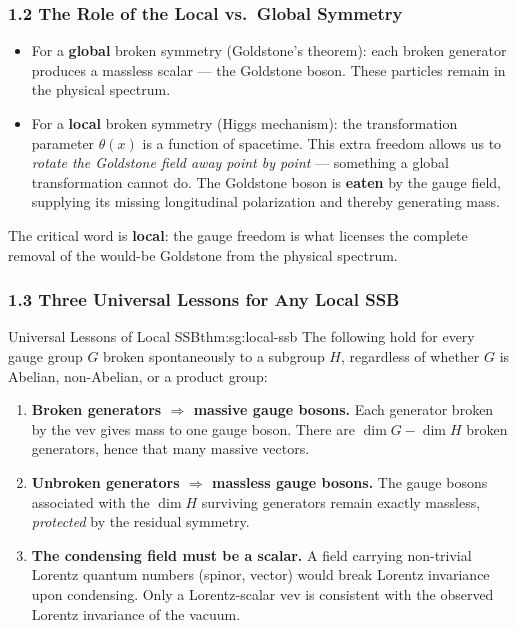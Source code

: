 \documentclass[12pt,a4paper]{article}
\newcommand{\thm}[3][]{\begin{Theorem}{#2}{#1}#3\end{Theorem}}
\begin{document}
\subsubsection*{1.2 \quad The Role of the Local vs.\ Global Symmetry}

\begin{itemize}
  \item For a \textbf{global} broken symmetry (Goldstone's theorem): each broken generator produces a massless scalar — the Goldstone boson. These particles remain in the physical spectrum.

  \item For a \textbf{local} broken symmetry (Higgs mechanism): the transformation parameter $\theta(x)$ is a function of spacetime. This extra freedom allows us to \emph{rotate the Goldstone field away point by point} — something a global transformation cannot do. The Goldstone boson is \textbf{eaten} by the gauge field, supplying its missing longitudinal polarization and thereby generating mass.
\end{itemize}

The critical word is \textbf{local}: the gauge freedom is what licenses the complete removal of the would-be Goldstone from the physical spectrum.

\subsubsection*{1.3 \quad Three Universal Lessons for Any Local SSB}

\thm[thm:sg:local-ssb]{Universal Lessons of Local SSB}{
  The following hold for every gauge group $G$ broken spontaneously to a subgroup $H$, regardless of whether $G$ is Abelian, non-Abelian, or a product group:
  \begin{enumerate}
    \item \textbf{Broken generators $\Rightarrow$ massive gauge bosons.} Each generator broken by the vev gives mass to one gauge boson. There are $\dim G - \dim H$ broken generators, hence that many massive vectors.
    \item \textbf{Unbroken generators $\Rightarrow$ massless gauge bosons.} The gauge bosons associated with the $\dim H$ surviving generators remain exactly massless, \emph{protected} by the residual symmetry.
    \item \textbf{The condensing field must be a scalar.} A field carrying non-trivial Lorentz quantum numbers (spinor, vector) would break Lorentz invariance upon condensing. Only a Lorentz-scalar vev is consistent with the observed Lorentz invariance of the vacuum.
  \end{enumerate}
}
\end{document}
